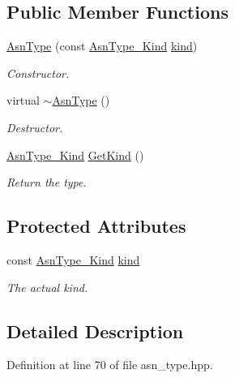 \subsection*{Public Member Functions}
\begin{DoxyCompactItemize}
\item 
\hyperlink{classAsnType_ad3a9031cce2ee85f2dbb5b9ca4c97340}{Asn\+Type} (const \hyperlink{asn__type_8hpp_a8d6021a223e1d3f16d93cac2f5ab45c3}{Asn\+Type\+\_\+\+Kind} \hyperlink{tree__common_8hpp_a9efbd7c7191fb190b76c2fd05d6e7b45}{kind})
\begin{DoxyCompactList}\small\item\em Constructor. \end{DoxyCompactList}\item 
virtual \hyperlink{classAsnType_aefbf788bb09a371193c8b3524322d62a}{$\sim$\+Asn\+Type} ()
\begin{DoxyCompactList}\small\item\em Destructor. \end{DoxyCompactList}\item 
\hyperlink{asn__type_8hpp_a8d6021a223e1d3f16d93cac2f5ab45c3}{Asn\+Type\+\_\+\+Kind} \hyperlink{classAsnType_a95aeacad529482040c59c91002aaed26}{Get\+Kind} ()
\begin{DoxyCompactList}\small\item\em Return the type. \end{DoxyCompactList}\end{DoxyCompactItemize}
\subsection*{Protected Attributes}
\begin{DoxyCompactItemize}
\item 
const \hyperlink{asn__type_8hpp_a8d6021a223e1d3f16d93cac2f5ab45c3}{Asn\+Type\+\_\+\+Kind} \hyperlink{classAsnType_ad7fc433abd92d41b6ff53ef828482df2}{kind}
\begin{DoxyCompactList}\small\item\em The actual kind. \end{DoxyCompactList}\end{DoxyCompactItemize}


\subsection{Detailed Description}


Definition at line 70 of file asn\+\_\+type.\+hpp.



